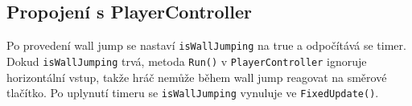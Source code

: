 \subsection{Propojení s PlayerController}
Po provedení wall jump se nastaví \texttt{isWallJumping} na true a odpočítává se timer. Dokud \texttt{isWallJumping} trvá, metoda \texttt{Run()} v \texttt{PlayerController} ignoruje horizontální vstup, takže hráč nemůže během wall jump reagovat na směrové tlačítko. Po uplynutí timeru se \texttt{isWallJumping} vynuluje ve \texttt{FixedUpdate()}.
